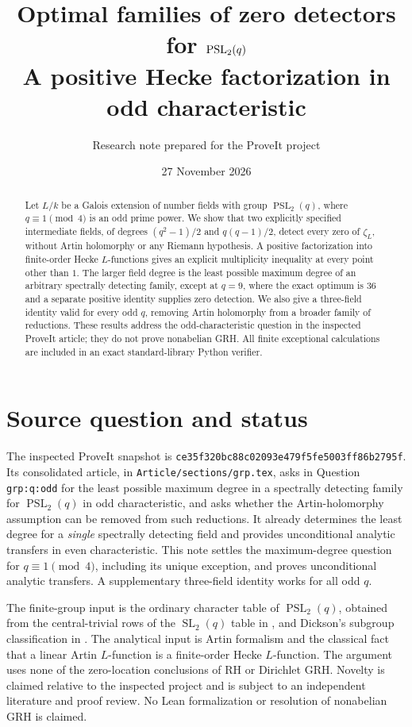 \documentclass[11pt]{article}
\title{Optimal families of zero detectors for $\PSL_2(q)$\\[4pt]
\large A positive Hecke factorization in odd characteristic}
\author{Research note prepared for the ProveIt project}
\date{27 November 2026}
\theoremstyle{remark}\newtheorem{remark}[theorem]{Remark}
\newcommand{\PSL}{\operatorname{PSL}}
\newcommand{\SL}{\operatorname{SL}}
\begin{document}
\maketitle
\begin{abstract}
Let $L/k$ be a Galois extension of number fields with group $\PSL_2(q)$,
where $q\equiv1\pmod4$ is an odd prime power. We show that two explicitly
specified intermediate fields, of degrees $(q^2-1)/2$ and $q(q-1)/2$,
detect every zero of $\zeta_L$, without Artin holomorphy or any Riemann
hypothesis. A positive factorization into finite-order Hecke $L$-functions
gives an explicit multiplicity inequality at every point other than $1$.
The larger field degree is the least possible maximum degree of an
arbitrary spectrally detecting family, except at $q=9$, where the exact
optimum is $36$ and a separate positive identity supplies zero detection.
We also give a three-field identity valid for every odd $q$, removing
Artin holomorphy from a broader family of reductions. These results address
the odd-characteristic question in the inspected ProveIt article; they
do not prove nonabelian GRH. All finite exceptional calculations are
included in an exact standard-library Python verifier.
\end{abstract}
\tableofcontents

\section{Source question and status}
The inspected ProveIt snapshot is
\texttt{ce35f320bc88c02093e479f5fe5003ff86b2795f}.
Its consolidated article, in \texttt{Article/sections/grp.tex}, asks in
Question \texttt{grp:q:odd} for the least possible maximum degree in a
spectrally detecting family for $\PSL_2(q)$ in odd characteristic, and asks
whether the Artin-holomorphy assumption can be removed from such
reductions. It already determines the least degree for a \emph{single}
spectrally detecting field and provides unconditional analytic transfers
in even characteristic. This note settles the maximum-degree question for
$q\equiv1\pmod4$, including its unique exception, and proves unconditional
analytic transfers. A supplementary three-field identity works for all
odd $q$.

The finite-group input is the ordinary character table of $\PSL_2(q)$,
obtained from the central-trivial rows of the $\SL_2(q)$ table in
\cite[Table 1]{BFL}, and Dickson's subgroup classification in
\cite[Theorem A.1]{GZ}. The analytical input is Artin formalism and the
classical fact that a linear Artin $L$-function is a finite-order Hecke
$L$-function. The argument uses none of the zero-location conclusions of
RH or Dirichlet GRH. Novelty is claimed relative to the inspected project
and is subject to an independent literature and proof review. No Lean
formalization or resolution of nonabelian GRH is claimed.
\end{document}
